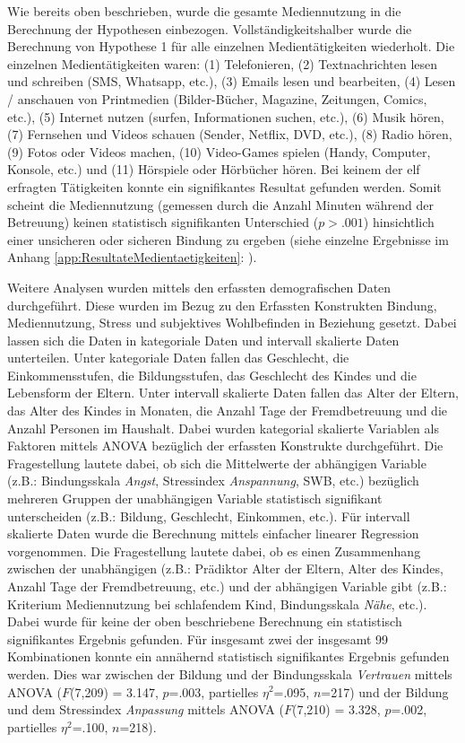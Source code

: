 Wie bereits oben beschrieben, wurde die gesamte Mediennutzung in die Berechnung der Hypothesen einbezogen. Vollständigkeitshalber wurde die Berechnung von Hypothese 1 für alle einzelnen Medientätigkeiten wiederholt. Die einzelnen Medientätigkeiten waren: (1) Telefonieren,  (2) Textnachrichten lesen und schreiben (SMS, Whatsapp, etc.), (3) Emails lesen und bearbeiten, (4) Lesen / anschauen von Printmedien (Bilder-Bücher, Magazine, Zeitungen, Comics, etc.), (5) Internet nutzen (surfen, Informationen suchen, etc.), (6) Musik hören, (7) Fernsehen und Videos schauen (Sender, Netflix, DVD, etc.), (8) Radio hören, (9) Fotos oder Videos machen, (10) Video-Games spielen (Handy, Computer, Konsole, etc.) und (11) Hörspiele oder Hörbücher hören. Bei keinem der elf erfragten Tätigkeiten konnte ein signifikantes Resultat gefunden werden. Somit scheint die Mediennutzung (gemessen durch die Anzahl Minuten während der Betreuung) keinen statistisch signifikanten Unterschied ($p>.001$) hinsichtlich einer unsicheren oder sicheren Bindung zu ergeben (siehe einzelne Ergebnisse im Anhang \ref{app:ResultateMedientaetigkeiten}: \textit{}).

Weitere Analysen wurden mittels den erfassten demografischen Daten durchgeführt. Diese wurden im Bezug zu den Erfassten Konstrukten Bindung, Mediennutzung, Stress und subjektives Wohlbefinden in Beziehung gesetzt. Dabei lassen sich die Daten in kategoriale Daten und intervall skalierte Daten unterteilen. Unter kategoriale Daten fallen das Geschlecht, die Einkommensstufen, die Bildungsstufen, das Geschlecht des Kindes und die Lebensform der Eltern. Unter intervall skalierte Daten fallen das Alter der Eltern, das Alter des Kindes in Monaten, die Anzahl Tage der Fremdbetreuung und die Anzahl Personen im Haushalt. Dabei wurden kategorial skalierte Variablen als Faktoren mittels ANOVA bezüglich der erfassten Konstrukte durchgeführt. Die Fragestellung lautete dabei, ob sich die Mittelwerte der abhängigen Variable (z.B.: Bindungsskala \textit{Angst}, Stressindex \textit{Anspannung}, SWB, etc.) bezüglich mehreren Gruppen der unabhängigen Variable statistisch signifikant unterscheiden  (z.B.: Bildung, Geschlecht, Einkommen, etc.). Für intervall skalierte Daten wurde die Berechnung mittels einfacher linearer Regression vorgenommen. Die Fragestellung lautete dabei, ob es einen Zusammenhang zwischen der unabhängigen (z.B.: Prädiktor Alter der Eltern, Alter des Kindes, Anzahl Tage der Fremdbetreuung, etc.) und der abhängigen Variable gibt (z.B.: Kriterium Mediennutzung bei schlafendem Kind, Bindungsskala \textit{Nähe}, etc.). Dabei wurde für keine der oben beschriebene Berechnung ein statistisch signifikantes Ergebnis gefunden. Für insgesamt zwei der insgesamt 99 Kombinationen konnte ein annähernd statistisch signifikantes Ergebnis gefunden werden. Dies war zwischen der Bildung und der Bindungsskala \textit{Vertrauen} mittels ANOVA ($F$(7,209) = 3.147, $p$=.003, partielles $\eta^2$=.095, $n$=217) und der Bildung und dem Stressindex \textit{Anpassung} mittels ANOVA ($F$(7,210) = 3.328, $p$=.002, partielles $\eta^2$=.100, $n$=218).

